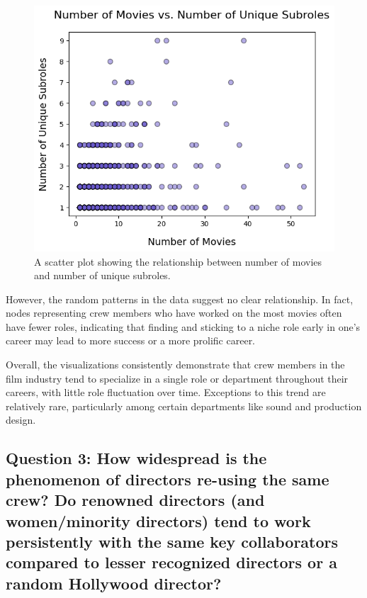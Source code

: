 \documentclass[12pt]{article}
\begin{document}
\begin{figure}[H]
    \centering
    \includegraphics[clip,scale=0.8] {2_scattermoviessubroles.png}
    \caption{A scatter plot showing the relationship between number of movies and number of unique subroles.}
    \label{fig:networkfiltered}
\end{figure}

However, the random patterns in the data suggest no clear relationship. In fact, nodes representing crew members who have worked on the most movies often have fewer roles, indicating that finding and sticking to a niche role early in one's career may lead to more success or a more prolific career.

Overall, the visualizations consistently demonstrate that crew members in the film industry tend to specialize in a single role or department throughout their careers, with little role fluctuation over time. Exceptions to this trend are relatively rare, particularly among certain departments like sound and production design.


\subsection*{Question 3: How widespread is the phenomenon of directors re-using the same crew? Do renowned directors (and women/minority directors) tend to work persistently with the same key collaborators compared to lesser recognized directors or a random Hollywood director?}
\end{document}

